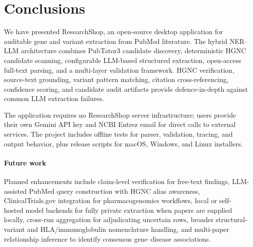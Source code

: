 \section{Conclusions}
\label{sec:conclusions}

We have presented ResearchShop, an open-source desktop application for auditable gene and variant extraction from PubMed literature. The hybrid NER--LLM architecture combines PubTator3 candidate discovery, deterministic HGNC candidate scanning, configurable LLM-based structured extraction, open-access full-text parsing, and a multi-layer validation framework. HGNC verification, source-text grounding, variant pattern matching, citation cross-referencing, confidence scoring, and candidate audit artifacts provide defence-in-depth against common LLM extraction failures.

The application requires no ResearchShop server infrastructure; users provide their own Gemini API key and NCBI Entrez email for direct calls to external services. The project includes offline tests for parser, validation, tracing, and output behavior, plus release scripts for macOS, Windows, and Linux installers.

\paragraph{Future work} Planned enhancements include claim-level verification for free-text findings, LLM-assisted PubMed query construction with HGNC alias awareness, ClinicalTrials.gov integration for pharmacogenomics workflows, local or self-hosted model backends for fully private extraction when papers are supplied locally, cross-run aggregation for adjudicating uncertain rows, broader structural-variant and HLA/immunoglobulin nomenclature handling, and multi-paper relationship inference to identify consensus gene--disease associations.
